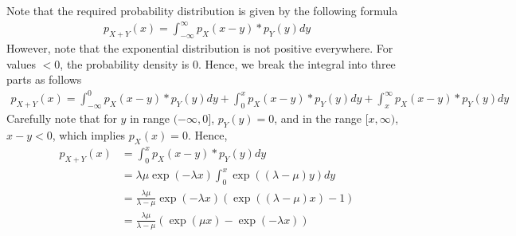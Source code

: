 \documentclass[../../probability-notes.tex]{subfiles}
\begin{document}
Note that the required probability distribution is given by the following formula
\begin{align*}
    p_{X+Y}(x) = \int_{-\infty}^{\infty} p_{X}(x-y) * p_{Y}(y) dy
\end{align*}
However, note that the exponential distribution is not positive everywhere. For values $ < 0$, the probability density is 0. Hence, we break the integral into three parts as follows
\begin{align*}
    p_{X+Y}(x) = \int_{-\infty}^{0} p_{X}(x-y) * p_{Y}(y) dy + \int_{0}^{x} p_{X}(x-y) * p_{Y}(y) dy + \int_{x}^{\infty} p_{X}(x-y) * p_{Y}(y) dy
\end{align*}
Carefully note that for $y$ in range $(-\infty,0]$, $p_{Y}(y) = 0$, and in the range $[x,\infty)$, $x-y < 0$, which implies $p_{X}(x) = 0$. Hence,
\begin{align*}
    p_{X+Y}(x) &= \int_{0}^{x} p_{X}(x-y) * p_{Y}(y) dy\\
    &= \lambda \mu \exp(-\lambda x) \int_{0}^{x} \exp((\lambda - \mu)y) dy\\
    &= \frac{\lambda \mu}{\lambda - \mu} \exp(-\lambda x) (\exp((\lambda - \mu)x) - 1)\\
    &= \frac{\lambda \mu}{\lambda - \mu}(\exp(\mu x) - \exp(-\lambda x))
\end{align*}
\end{document}
